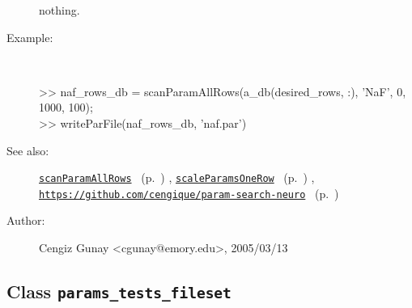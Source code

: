\begin{description}
   nothing.
%
\item[Example:]~
\begin{lyxcode}>> naf\_rows\_db = scanParamAllRows(a\_db(desired\_rows, :), 'NaF', 0, 1000, 100);
\\%
>> writeParFile(naf\_rows\_db, 'naf.par')
\\%
\end{lyxcode}
%
\item[See also:]%
\hyperlink{ref_scanParamAllRows}{\texttt{scanParamAllRows}}%
\ (p.~\pageref{ref_scanParamAllRows})%
%
, \hyperlink{ref_scaleParamsOneRow}{\texttt{scaleParamsOneRow}}%
\ (p.~\pageref{ref_scaleParamsOneRow})%
%
, \hyperlink{ref_https:__}{\texttt{https://github.com/cengique/param-search-neuro}}%
\ (p.~\pageref{ref_https:__})%
%
%
\item[Author:]%
Cengiz Gunay <cgunay@emory.edu>, 2005/03/13
%
\end{description}
\methodline%
\subsection{Class \texttt{params\_tests\_fileset}}%
%
\label{ref_params_tests_fileset}%
\hypertarget{ref_params_tests_fileset}{}%
